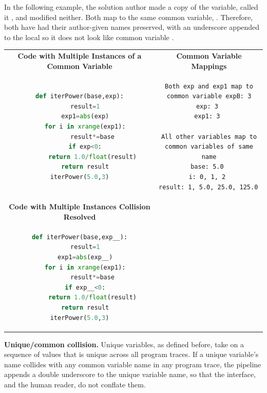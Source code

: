 In the following example, the solution author made a copy of the  variable, called it , and modified neither. Both map to the same common variable, . Therefore, both have had their author-given names preserved, with an underscore appended to the local  so it does not look like common variable . 

\begin{tabular}{cc}
{\bf Code with Multiple Instances of a Common Variable} & {\bf Common Variable Mappings} \\
\begin{minipage}{0.5\linewidth}
\begin{lstlisting}[language=python]
def iterPower(base,exp):
   result=1
   exp1=abs(exp)
   for i in xrange(exp1):
       result*=base
   if exp<0:
       return 1.0/float(result)
   return result
iterPower(5.0,3)
\end{lstlisting}
\end{minipage}
&
\begin{minipage}{0.5\linewidth}
\begin{lstlisting}[]
Both exp and exp1 map to common variable expB: 3
exp: 3 
exp1: 3 

All other variables map to common variables of same name
base: 5.0 
i: 0, 1, 2 
result: 1, 5.0, 25.0, 125.0 
\end{lstlisting}
\end{minipage} \\
{\bf Code with Multiple Instances Collision Resolved} & \\
\begin{minipage}{0.5\linewidth}
\begin{lstlisting}[language=python,linebackgroundcolor={\lstcolorlines[lightyellow]{1,3,6}}]
def iterPower(base,exp__):
   result=1
   exp1=abs(exp__)
   for i in xrange(exp1):
       result*=base
   if exp__<0:
       return 1.0/float(result)
   return result
iterPower(5.0,3)
\end{lstlisting}
\end{minipage}
& \\
\end{tabular}

{\bf Unique/common collision.} Unique variables, as defined before, take on a sequence of values that is unique across all program traces. If a unique variable's name collides with any common variable name in any program trace, the pipeline appends a double underscore to the unique variable name, so that the interface, and the human reader, do not conflate them. 

